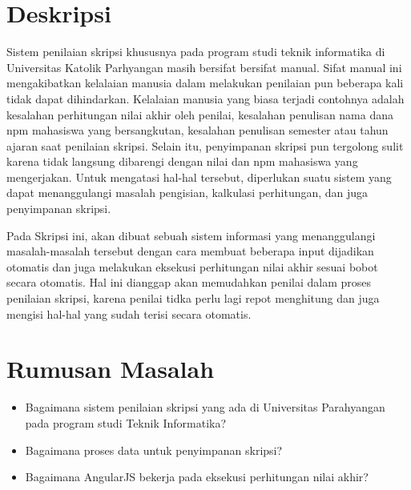 \documentclass[a4paper,twoside]{article}
\begin{document}
\title{\@judultopik}
\author{\nama \textendash \@npm} 

\newcommand{\nama}{Billy Yanuar}
\newcommand{\@npm}{2012730017}
\newcommand{\@judultopik}{Sistem Operasi Penilaian Skripsi dengan AngularJS} %
\newcommand{\jumpemb}{1} %
\newcommand{\tanggal}{11/02/2016}
\maketitle


\section{Deskripsi}
Sistem penilaian skripsi khususnya pada program studi teknik informatika di Universitas Katolik Parhyangan masih bersifat bersifat manual. Sifat manual ini mengakibatkan kelalaian manusia dalam melakukan penilaian pun beberapa kali tidak dapat dihindarkan. Kelalaian manusia yang biasa terjadi contohnya adalah kesalahan perhitungan nilai akhir oleh penilai, kesalahan penulisan nama dana npm mahasiswa yang bersangkutan, kesalahan penulisan semester atau tahun ajaran saat penilaian skripsi. Selain itu, penyimpanan skripsi pun tergolong sulit karena tidak langsung dibarengi dengan nilai dan npm mahasiswa yang mengerjakan. Untuk mengatasi hal-hal tersebut, diperlukan suatu sistem yang dapat menanggulangi masalah pengisian, kalkulasi perhitungan, dan juga penyimpanan skripsi.

Pada Skripsi ini, akan dibuat sebuah sistem informasi yang menanggulangi masalah-masalah tersebut dengan cara membuat beberapa input dijadikan otomatis dan juga melakukan eksekusi perhitungan nilai akhir sesuai bobot secara otomatis. Hal ini dianggap akan memudahkan penilai dalam proses penilaian skripsi, karena penilai tidka perlu lagi repot menghitung dan juga mengisi hal-hal yang sudah terisi secara otomatis.


\section{Rumusan Masalah}
\begin{itemize}
	\item Bagaimana sistem penilaian skripsi yang ada di Universitas Parahyangan pada program studi Teknik Informatika?
	\item Bagaimana proses data untuk penyimpanan skripsi?
	\item Bagaimana AngularJS bekerja pada eksekusi perhitungan nilai akhir?
\end{itemize}
\end{document}
